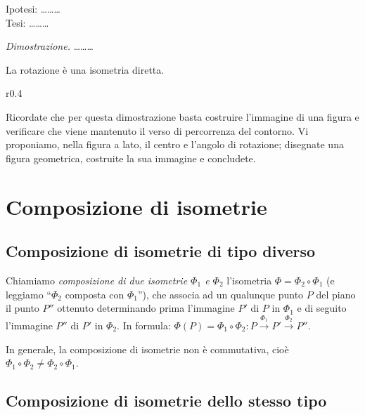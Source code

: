 \noindent Ipotesi: \ldots\ldots\ldots{}\\
Tesi: \ldots\ldots\ldots{}
    
\noindent\emph{Dimostrazione.} \ldots\ldots\ldots{}
    
\begin{teorema}
La rotazione è una isometria diretta.
\end{teorema}
    
\setlength{\intextsep}{3pt plus 2.0pt minus 2.0pt}
\begin{wrapfigure}{r}{0.4\textwidth}
  \centering
\end{wrapfigure}
Ricordate che per questa dimostrazione basta costruire l'immagine di 
una figura e verificare che viene mantenuto il verso di percorrenza 
del contorno. Vi proponiamo, nella figura a lato, il centro e 
l'angolo di rotazione; disegnate una figura geometrica, costruite la 
sua immagine e concludete.

    
\section{Composizione di isometrie}
\label{sect:composizione_isometrie}
    
\subsection{Composizione di isometrie di tipo diverso}
  
  
\begin{definizione}
Chiamiamo \emph{composizione di due isometrie $\Phi_1$ e $\Phi_2$} 
l'isometria $\Phi = \Phi_2 \circ \Phi_1$ (e leggiamo ``$\Phi_2$ 
composta con $\Phi_1$''), che associa ad un qualunque punto $P$ del 
piano il punto $P''$ ottenuto determinando prima l'immagine $P'$ di 
$P$ in $\Phi_1$ e di seguito l'immagine $P''$ di $P'$ in $\Phi_2$. In 
formula: $\Phi(P)=\Phi_1 \circ \Phi_2:P\overset{\Phi_1}\rightarrow P' 
\overset{\Phi_2}\rightarrow P''$.
\end{definizione}

In generale, la composizione di isometrie non è commutativa, cioè 
$\Phi_1\circ\Phi_2 \neq \Phi_2\circ\Phi_1$.
      
      
\subsection{Composizione di isometrie dello stesso tipo}

